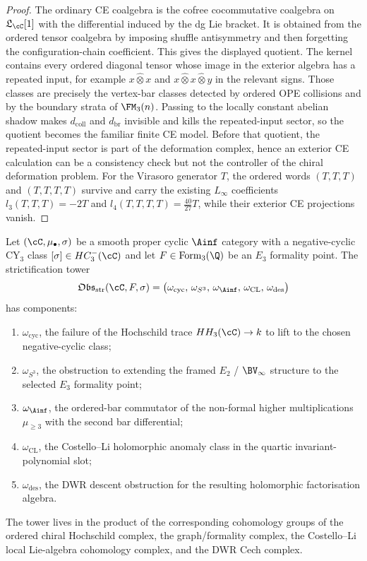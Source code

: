 \begin{proof}
The ordinary CE coalgebra is the cofree cocommutative coalgebra on
$\mathfrak L_{\cC}[1]$ with the differential induced by the dg Lie
bracket. It is obtained from the ordered tensor coalgebra by imposing
shuffle antisymmetry and then forgetting the configuration-chain
coefficient. This gives the displayed quotient. The kernel contains
every ordered diagonal tensor whose image in the exterior algebra has a
repeated input, for example $x\widehat\otimes x$ and
$x\widehat\otimes x\widehat\otimes y$ in the relevant signs. Those
classes are precisely the vertex-bar classes detected by ordered OPE
collisions and by the boundary strata of $\FM_3(n)$. Passing to the
locally constant abelian shadow makes $d_{\mathrm{coll}}$ and
$d_{\mathrm{br}}$ invisible and kills the repeated-input sector, so the
quotient becomes the familiar finite CE model. Before that quotient,
the repeated-input sector is part of the deformation complex, hence an
exterior CE calculation can be a consistency check but not the controller
of the chiral deformation problem. For the Virasoro generator $T$, the
ordered words $(T,T,T)$ and $(T,T,T,T)$ survive and carry the existing
$L_\infty$ coefficients $l_3(T,T,T)=-2T$ and
$l_4(T,T,T,T)=\frac{40}{27}T$, while their exterior CE projections
vanish.
\end{proof}

\begin{definition}
\label{def:cy3-strictification-obstruction-tower}
Let $(\cC,\mu_\bullet,\sigma)$ be a smooth proper cyclic $\Ainf$
category with a negative-cyclic CY$_3$ class
$[\sigma]\in HC^{-}_3(\cC)$ and let $F\in\mathrm{Form}_3(\Q)$ be an
$E_3$ formality point. The strictification tower
\[
 \mathfrak{Obs}_{\mathrm{str}}(\cC,F,\sigma)
 =
 \bigl(
 \omega_{\mathrm{cyc}},\,
 \omega_{S^3},\,
 \omega_{\Ainf},\,
 \omega_{\mathrm{CL}},\,
 \omega_{\mathrm{des}}
 \bigr)
\]
has components:
\begin{enumerate}
\item $\omega_{\mathrm{cyc}}$, the failure of the Hochschild trace
$HH_3(\cC)\to k$ to lift to the chosen negative-cyclic class;
\item $\omega_{S^3}$, the obstruction to extending the framed
$E_2$ / $\BV_\infty$ structure to the selected $E_3$ formality point;
\item $\omega_{\Ainf}$, the ordered-bar commutator of the non-formal
higher multiplications $\mu_{\geq3}$ with the second bar differential;
\item $\omega_{\mathrm{CL}}$, the Costello--Li holomorphic anomaly
class in the quartic invariant-polynomial slot;
\item $\omega_{\mathrm{des}}$, the DWR descent obstruction for the
resulting holomorphic factorisation algebra.
\end{enumerate}
The tower lives in the product of the corresponding cohomology groups
of the ordered chiral Hochschild complex, the graph/formality complex,
the Costello--Li local Lie-algebra cohomology complex, and the DWR
Cech complex.
\end{definition}

